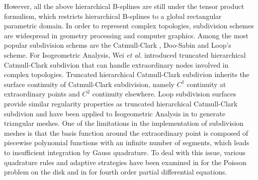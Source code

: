 However, all the above hierarchical B-splines are still under the tensor product formulism, which restricts hierarchical B-splines to a global rectangular parametric domain. In order to represent complex topologies, subdivision schemes are widespread in geometry processing and computer graphics. Among the most popular subdivision schems are the Catmull-Clark \cite{catmull_recursively_1978}, Doo-Sabin \cite{doo_behaviour_1978} and Loop's \cite{loop_smooth_1987} scheme. For Isogeometric Analysis, Wei \textit{et al.} \cite{wei_truncated_2015} introduced truncated hierarchical Catmull-Clark subdivion that can handle extraordinary nodes involved in complex topologies. Truncated hierarchical Catmull-Clark subdivion inherits the surface continuity of Catmull-Clark subdivision, namely $C^1$ continuity at extraordinary points and $C^2$ continuity elsewhere. Loop subdivision surfaces provide similar regularity properties as truncated hierarchical Catmull-Clark subdivion and have been applied to Isogeometric Analysis in \cite{kang_truncated_2016,pan_isogeometric_2015} to generate triangular meshes. One of the limitations in the implementation of subdivision meshes is that the basis function around the extraordinary point is composed of piecewise polynomial functions with an infinite number of segments, which leads to insufficient integration by Gauss quadrature. To deal with this issue, various quadrature rules and adaptive strategies have been examined in \cite{nguyen_comparative_2014} for the Poisson problem on the disk and in \cite{juttler_numerical_2016} for fourth order partial differential equations. \par
